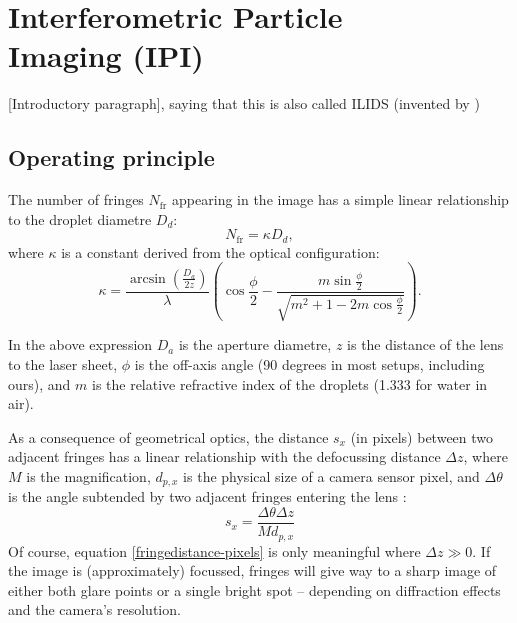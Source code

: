 \documentclass[11.5pt]{book}
\begin{document}
    \chapter[Interferometric Particle Imaging (IPI)]{Interferometric Particle\\ Imaging (IPI)}
    [Introductory paragraph], saying that this is also called ILIDS (invented by
    \citet{Glover95})
\section{Operating principle}
The number of fringes $N_\text{fr}$ appearing in the image has a simple linear relationship to
the droplet diametre $D_d$:
\begin{equation}
    N_\text{fr} = \kappa D_d,
\end{equation}
where $\kappa$ is a constant derived from the optical configuration:
\begin{equation}
    \kappa = \frac{\arcsin\left(\frac{D_a}{2z}\right)}{\lambda}
    \left(\cos\frac{\phi}{2} - \frac{m \sin\frac{\phi}{2}}{\sqrt{m^2 + 1 -
    2m\cos \frac{\phi}{2}}}\right).
    \label{kappa}
\end{equation}

In the above expression $D_a$ is the aperture diametre, $z$ is the distance of
the lens to the laser sheet, $\phi$ is the off-axis angle (90 degrees in most
setups, including ours), and $m$ is the relative refractive index of the
droplets (1.333 for water in air).

As a consequence of geometrical optics, the distance $s_x$ (in pixels) between two
adjacent fringes has a linear relationship with the defocussing distance $\Delta
z$, where $M$ is the magnification, $d_{p,x}$ is the physical size of a
camera sensor pixel, and $\Delta \theta$ is the angle subtended by two adjacent
fringes entering the lens \cite{Pan06}:
\begin{equation}
  s_x = \frac{\Delta \theta \Delta z}{M d_{p,x}} 
  \label{fringedistance-pixels}
\end{equation}
Of course, equation \eqref{fringedistance-pixels} is only meaningful where $\Delta z \gg
0$. If the image is (approximately) focussed, fringes will give way to a sharp
image of either both glare points or a single bright spot -- depending on
diffraction effects and the camera's resolution.
\end{document}
